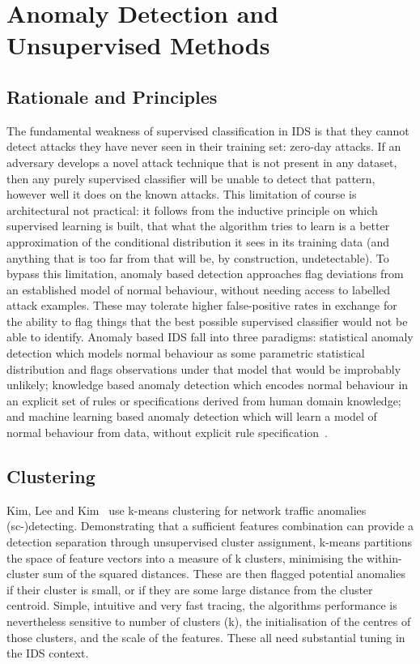 \section{Anomaly Detection and Unsupervised Methods}

\subsection{Rationale and Principles}
The fundamental weakness of supervised classification in IDS is that they cannot detect attacks they have never seen in their training set: zero-day attacks. If an adversary develops a novel attack technique that is not present in any dataset, then any purely supervised classifier will be unable to detect that pattern, however well it does on the known attacks. This limitation of course is architectural not practical: it follows from the inductive principle on which supervised learning is built, that what the algorithm tries to learn is a better approximation of the conditional distribution it sees in its training data (and anything that is too far from that will be, by construction, undetectable).
To bypass this limitation, anomaly based detection approaches flag deviations from an established model of normal behaviour, without needing access to labelled attack examples. These may tolerate higher false-positive rates in exchange for the ability to flag things that the best possible supervised classifier would not be able to identify.
Anomaly based IDS fall into three paradigms: statistical anomaly detection which models normal behaviour as some parametric statistical distribution and flags observations under that model that would be improbably unlikely; knowledge based anomaly detection which encodes normal behaviour in an explicit set of rules or specifications derived from human domain knowledge; and machine learning based anomaly detection which will learn a model of normal behaviour from data, without explicit rule specification~\cite{khraisat2019survey}. \subsection{Clustering}

Kim, Lee and Kim~\cite{kim2014hybrid} use k-means clustering for network traffic anomalies (sc-)detecting. Demonstrating that a sufficient features combination can provide a detection separation through unsupervised cluster assignment, k-means partitions the space of feature vectors into a measure of k clusters, minimising the within-cluster sum of the squared distances. These are then flagged potential anomalies if their cluster is small, or if they are some large distance from the cluster centroid. Simple, intuitive and very fast tracing, the algorithms performance is nevertheless sensitive to number of clusters (k), the initialisation of the centres of those clusters, and the scale of the features. These all need substantial tuning in the IDS context.

